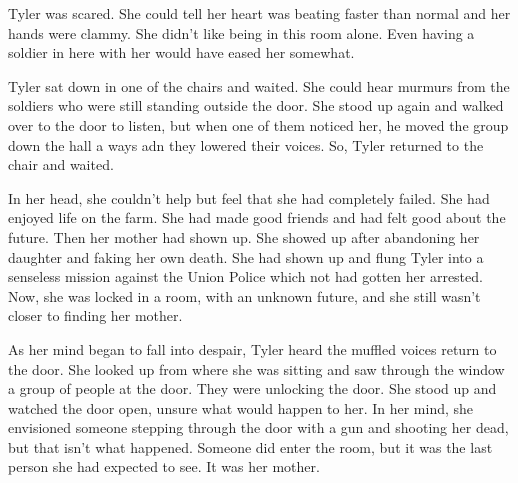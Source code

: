 \documentclass[courier]{sffms}
\begin{document}
Tyler was scared. She could tell her heart was beating
faster than normal and her hands were clammy. She
didn't like being in this room alone. Even having a soldier
in here with her would have eased her somewhat.

Tyler sat down in one of the chairs and waited. She
could hear murmurs from the soldiers who were still
standing outside the door. She stood up again and
walked over to the door to listen, but when one of
them noticed her, he moved the group down the
hall a ways adn they lowered their voices. So, Tyler
returned to the chair and waited.

In her head, she couldn't help but feel that she had
completely failed. She had enjoyed life on the farm.
She had made good friends and had felt good about
the future. Then her mother had shown up. She showed
up after abandoning her daughter and faking her own
death. She had shown up and flung Tyler into a senseless
mission against the Union Police which not had gotten
her arrested. Now, she was locked in a room, with
an unknown future, and she still wasn't closer to 
finding her mother.

As her mind began to fall into despair, Tyler heard the
muffled voices return to the door. She looked up from
where she was sitting and saw through the window a
group of people at the door. They were unlocking the
door. She stood up and watched the door open, unsure
what would happen to her. In her mind, she envisioned
someone stepping through the door with a gun and
shooting her dead, but that isn't what happened.
Someone did enter the room, but it was the last person
she had expected to see. It was her mother.
\end{document}
